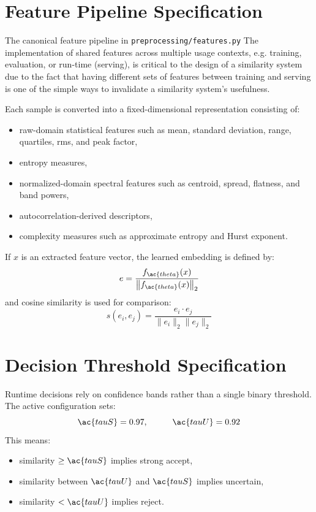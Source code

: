 \section{Feature Pipeline Specification}
The canonical feature pipeline in \texttt{preprocessing/features.py} The implementation of shared features across multiple usage contexts, e.g. training, evaluation, or run-time (serving), is critical to the design of a similarity system due to the fact that having different sets of features between training and serving is one of the simple ways to invalidate a similarity system’s usefulness.

Each sample is converted into a fixed-dimensional representation consisting of:
\begin{itemize}
	\item raw-domain statistical features such as mean, standard deviation, range, quartiles, \ac{rms}, and peak factor,
	\item entropy measures,
	\item normalized-domain spectral features such as centroid, spread, flatness, and band powers,
	\item autocorrelation-derived descriptors,
	\item complexity measures such as approximate entropy and Hurst exponent.
\end{itemize}

If $x$ is an extracted feature vector, the learned embedding is defined by:
\begin{equation}
e = \frac{f_{\ac{theta}}(x)}{\left\|f_{\ac{theta}}(x)\right\|_2}
\end{equation}
and cosine similarity is used for comparison:
\begin{equation}
s(e_i,e_j) = \frac{e_i \cdot e_j}{\|e_i\|_2 \|e_j\|_2}
\end{equation}

\section{Decision Threshold Specification}
Runtime decisions rely on confidence bands rather than a single binary threshold. The active configuration sets:
\begin{equation}
\ac{tauS} = 0.97,\hspace{1cm}\ac{tauU} = 0.92
\end{equation}
This means:
\begin{itemize}
	\item similarity $\geq \ac{tauS}$ implies strong accept,
	\item similarity between $\ac{tauU}$ and $\ac{tauS}$ implies uncertain,
	\item similarity $< \ac{tauU}$ implies reject.
\end{itemize}

